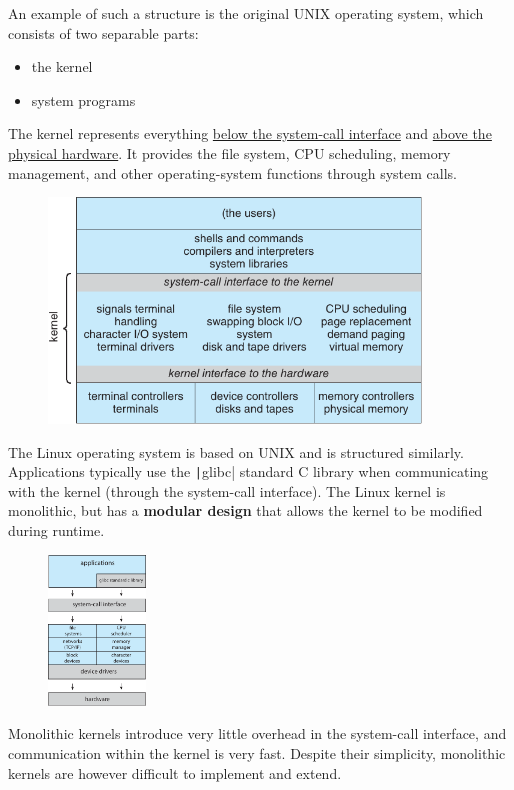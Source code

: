 \documentclass{article}
\begin{document}
An example of such a structure is the original UNIX operating system, which consists of two separable parts:
\begin{itemize}
    \item the kernel
    \item system programs
\end{itemize}
The kernel represents everything \underline{below the system-call interface} and \underline{above the physical hardware}.
It provides the file system, CPU scheduling, memory management, and other operating-system functions through system calls.
\begin{figure}[H]
    \centering
    \includegraphics[height = 6cm]{figures/UNIX_structure.pdf}
\end{figure}
The Linux operating system is based on UNIX and is structured similarly. Applications
typically use the \texttt|glibc| standard C library when communicating with the kernel (through the system-call interface).
The Linux kernel is monolithic, but has a \textbf{modular design} that allows the kernel to be modified during runtime.
\begin{figure}[H]
    \centering
    \includegraphics[height = 4cm]{figures/linux_structure.pdf}
\end{figure}
Monolithic kernels introduce very little overhead in the system-call interface,
and communication within the kernel is very fast. Despite their simplicity,
monolithic kernels are however difficult to implement and extend.
\end{document}
